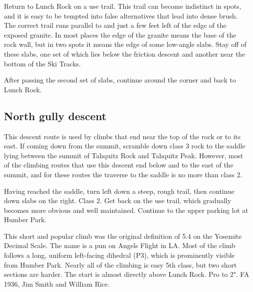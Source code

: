 \documentclass{tahquitz}
\begin{document}
Return to Lunch Rock on a use trail. This trail can become indistinct in spots,
and it is easy to be tempted into false alternatives that lead into dense
brush. The correct trail runs parallel to and just a few feet left of the
edge of the exposed granite. In most places the edge of the granite means the base
of the rock wall, but in two spots it means the edge of some low-angle
slabs. Stay off of these slabs, one set of which lies
below the friction descent
and another near the bottom of the Ski Tracks.

After passing the second set of slabs,
continue around the corner and back to Lunch Rock.

\subsection{North gully descent}\label{subsec:north-gully-descent}

This descent route is used by climbs that end near the top of the rock
or to its east. If coming down from the summit, scramble down class 3
rock to the saddle lying between the summit of Tahquitz Rock and
Tahquitz Peak. However, most of the climbing routes that use this descent end below and to
the east of the summit, and for these routes the traverse to the saddle is no more than
class 2.

Having reached the saddle, turn left down a steep, rough trail, then continue down slabs on the right.
Class 2. Get back on the use trail, which gradually becomes more obvious and well maintained.
Continue to the upper parking lot at Humber Park.



\normalparindent





This short and popular climb was the original definition of 5.4 on the Yosemite Decimal Scale.
The name is a pun on Angels Flight in LA.
Most of the climb follows a long, uniform left-facing dihedral (P3), which is prominently
visible from Humber Park. Nearly all of the climbing is easy 5th class, but two short
sections are harder.
The start is almost directly above Lunch Rock. Pro to 2". FA
1936, Jim Smith and William Rice.
\end{document}
